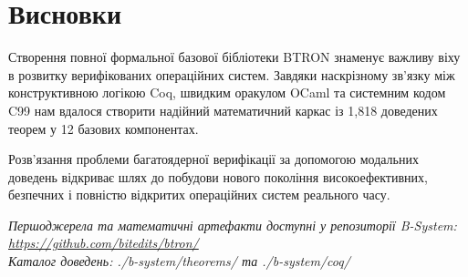 \documentclass{article}
\begin{document}
\section{Висновки}

Створення повної формальної базової бібліотеки BTRON знаменує важливу віху в розвитку верифікованих операційних систем. Завдяки наскрізному зв'язку між конструктивною логікою Coq, швидким оракулом OCaml та системним кодом C99 нам вдалося створити надійний математичний каркас із 1,818 доведених теорем у 12 базових компонентах.

Розв'язання проблеми багатоядерної верифікації за допомогою модальних доведень відкриває шлях до побудови нового покоління високоефективних, безпечних і повністю відкритих операційних систем реального часу.

\vspace{1.5cm}
\begin{center}
\textit{Першоджерела та математичні артефакти доступні у репозиторії B-System:}\\
\textit{\url{https://github.com/bitedits/btron/}}\\
\textit{Каталог доведень: ./b-system/theorems/ та ./b-system/coq/}
\end{center}
\end{document}

